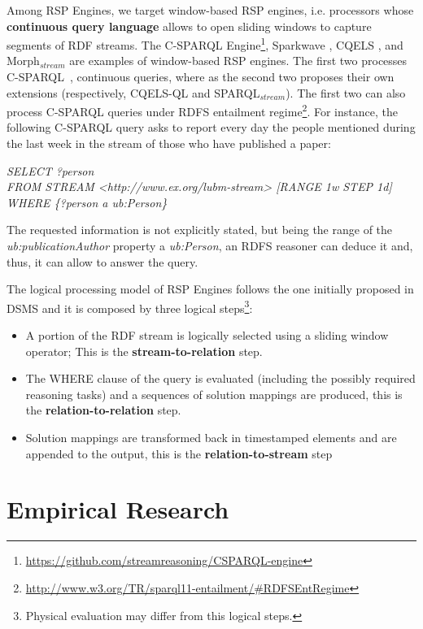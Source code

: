 Among RSP Engines, we target window-based RSP engines, i.e. processors whose \textbf{continuous query language} allows to open sliding windows to capture segments of RDF streams. The C-SPARQL Engine\footnote{\url{https://github.com/streamreasoning/CSPARQL-engine}}, Sparkwave \cite{DBLP:conf/debs/KomazecCF12}, CQELS \cite{Lephuoc2011}, and Morph$_{stream}$ \cite{Calbimonte2012}  are examples of window-based RSP engines.  The first two processes C-SPARQL~\cite{Barbieri2010}, continuous queries, where as the second two proposes their own extensions (respectively, CQELS-QL and SPARQL$_{stream}$). The first two can also process C-SPARQL queries under RDFS entailment regime\footnote{\url{http://www.w3.org/TR/sparql11-entailment/#RDFSEntRegime}}. For instance, the following C-SPARQL query asks to report every day the people mentioned during the last week in the stream of those who have published a paper:

\vspace{5pt}
\noindent\textit{SELECT ?person}\\
\textit{FROM STREAM <http://www.ex.org/lubm-stream> [RANGE 1w STEP 1d]}\\
\textit{WHERE \{?person a ub:Person\}}
\vspace{5pt}

The requested information is not explicitly stated, but being the range of the \textit{ub:publicationAuthor} property a \textit{ub:Person}, an RDFS reasoner can deduce it and, thus, it can allow to answer the query.

The logical processing model of RSP Engines follows the one initially proposed in DSMS and it is composed by three logical steps\footnote{Physical evaluation may differ from this logical steps.}: 
\begin{itemize}
\item[1.] A portion of the RDF stream is logically selected using a sliding window operator; This is the \textbf{stream-to-relation} step. 
\item[2.] The WHERE clause of the query is evaluated (including the possibly required reasoning tasks) and a sequences of solution mappings are produced, this is the \textbf{relation-to-relation} step.
\item[3.] Solution mappings are transformed back in timestamped elements and are appended to the output, this is the \textbf{relation-to-stream} step 
\end{itemize}


\section{Empirical Research}\label{sec:empirical-research}

